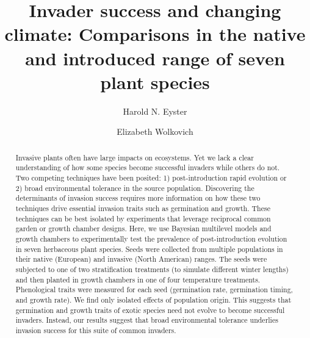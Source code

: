 \documentclass[12pt]{article}\usepackage[]{graphicx}\usepackage[]{color}
\title{Invader success and changing climate: Comparisons in the native and introduced range of seven plant species}
\author[1]{Harold N. Eyster}
\author[2]{Elizabeth Wolkovich}
\affil[1]{Institute for Resources, Environment, and Sustainability, University of British Columbia}
\affil[2]{Department of Forest and Conservation Science, University of British Columbia}
\date{}                     %
\begin{document}
\maketitle

\begin{spacing}{1} %
	\begin{abstract}
		Invasive plants often have large impacts on ecosystems.  Yet we lack a clear understanding of how some species become successful invaders while others do not. Two competing techniques have been posited: 1) post-introduction rapid evolution or 2) broad environmental tolerance in the source population. 
		Discovering the determinants of invasion success requires more information on how these two techniques drive essential invasion traits such as germination and growth. These techniques can be best isolated by experiments that leverage reciprocal common garden or growth chamber designs. 
		Here, we use Bayesian multilevel models and growth chambers to experimentally test the prevalence of post-introduction evolution in seven herbaceous plant species. Seeds were collected from multiple populations in their native (European) and invasive (North American) ranges. The seeds were subjected to one of two stratification treatments (to simulate different winter lengths) and then planted in growth chambers in one of four temperature treatments. Phenological traits were measured for each seed (germination rate, germination timing, and growth rate). We find only isolated effects of population origin. This suggests that germination and growth traits of exotic species need not evolve to become successful invaders. Instead, our results suggest that broad environmental tolerance underlies invasion success for this suite of common invaders. %
	\end{abstract}
\end{spacing}		
\end{document}
